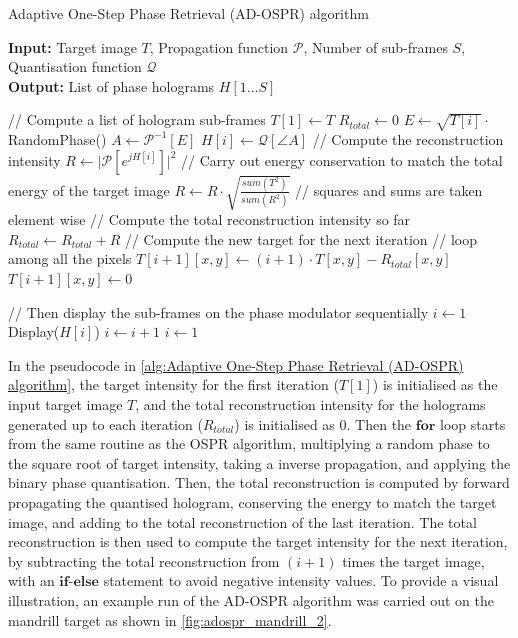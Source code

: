 \begin{algorithm}[H]
  \caption{Adaptive One-Step Phase Retrieval (AD-OSPR) algorithm}\label{alg:Adaptive One-Step Phase Retrieval (AD-OSPR) algorithm}
  \textbf{Input:} Target image $T$, Propagation function $\mathcal{P}$, Number of sub-frames $S$, Quantisation function $\mathcal{Q}$\\
  \textbf{Output:} List of phase holograms $H[1\ldots S]$
  \begin{algorithmic}
    \State // Compute a list of hologram sub-frames
    \State $T[1] \gets T$
    \State $R_{total} \gets 0$
    \State $E \gets \sqrt{T[i]} \cdot$ RandomPhase()
    \State $A \gets \mathcal{P}^{-1}[E]$
    \State $H[i] \gets \mathcal{Q}[\angle A]$
    \State // Compute the reconstruction intensity
    \State $R \gets \vert \mathcal{P}[e^{jH[i]}] \vert ^2$
    \State // Carry out energy conservation to match the total energy of the target image
    \State $R \gets R \cdot \sqrt{\frac{sum(T^2)}{sum(R^2)}} $ // squares and sums are taken element wise
    \State // Compute the total reconstruction intensity so far
    \State $R_{total} \gets R_{total} + R$
    \State // Compute the new target for the next iteration
     // loop among all the pixels
    \State $T[i+1][x,y] \gets (i+1)\cdot T[x,y] - R_{total}[x,y]$
    \Else
    \State $T[i+1][x,y] \gets 0$
    \EndIf
    \EndFor

    \EndFor
    \State // Then display the sub-frames on the phase modulator sequentially
    \State $i\gets 1$
    \State Display($H[i]$)
    \State $i\gets i + 1$
    \State $i\gets 1$
    \EndIf
    \EndWhile
  \end{algorithmic}
\end{algorithm}

In the pseudocode in \cref{alg:Adaptive One-Step Phase Retrieval (AD-OSPR) algorithm}, the target intensity for the first iteration ($T[1]$) is initialised as the input target image $T$, and the total reconstruction intensity for the holograms generated up to each iteration ($R_{total}$) is initialised as 0. Then the $\textbf{for}$ loop starts from the same routine as the OSPR algorithm, multiplying a random phase to the square root of target intensity, taking a inverse propagation, and applying the binary phase quantisation. Then, the total reconstruction is computed by forward propagating the quantised hologram, conserving the energy to match the target image, and adding to the total reconstruction of the last iteration. The total reconstruction is then used to compute the target intensity for the next iteration, by subtracting the total reconstruction from $(i+1)$ times the target image, with an $\textbf{if-else}$ statement to avoid negative intensity values. To provide a visual illustration, an example run of the AD-OSPR algorithm was carried out on the mandrill target as shown in \cref{fig:adospr_mandrill_2}.

